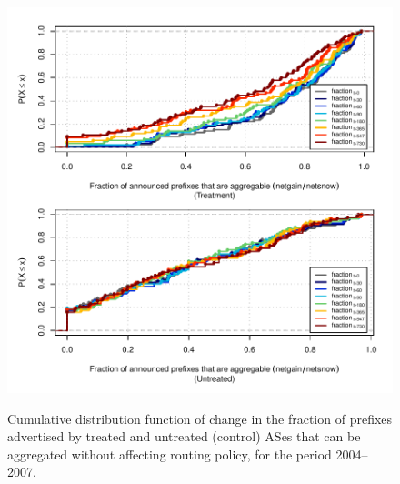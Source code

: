 \begin{figure}[H]
\begin{centering}
\begin{singlespace}
    \includegraphics[width=6in]{figures/behavior-frac_deagg-2004_2007-corr.pdf}
    \vspace{-2em}\\
    \caption{Cumulative distribution function of change in the fraction of prefixes advertised by treated and untreated (control) ASes that can be aggregated without affecting routing policy, for the period 2004--2007.}
\end{singlespace}
\end{centering}
\end{figure}
